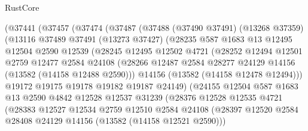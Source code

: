 \begin{lexlean}{RustCore}
\begin{coremodule}
            (@37441
              (@37457
                (@37474
                  (@37487
                    (@37488
                      (@37490 @37491)
                      (@13268 @37359)
                      (@13116
                        @37489
                        @37491
                        (@13273 @37427)
                        (@28235
                          @587
                          @1683
                          @13
                          @12495
                          @12504
                          @2590
                          @12539
                          (@28245
                            @12495
                            @12502
                            @4721
                            (@28252
                              @12494
                              @12501
                              @2759
                              @12477
                              @2584
                              @24108
                              (@28266
                                @12487
                                @2584
                                @28277
                                @24129
                                @14156
                                (@13582 (@14158 @12488 @2590)))
                              @14156
                              (@13582 (@14158 @12478 @12494)))
                            @19172
                            @19175
                            @19178
                            @19182
                            @19187
                            @24149)
                          (@24155
                            @12504
                            @587
                            @1683
                            @13
                            @2590
                            @4842
                            @12528
                            @12537
                            @31239
                            (@28376
                              @12528
                              @12535
                              @4721
                              (@28383
                                @12527
                                @12534
                                @2759
                                @12510
                                @2584
                                @24108
                                (@28397
                                  @12520
                                  @2584
                                  @28408
                                  @24129
                                  @14156
                                  (@13582 (@14158 @12521 @2590)))

\end{coremodule}
\end{lexlean}
